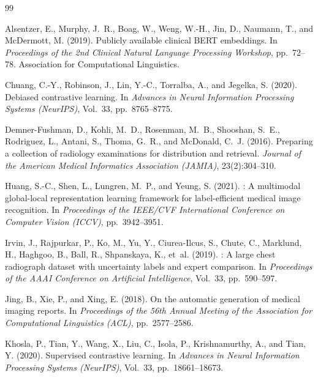 \documentclass[12pt, a4paper]{article}
\begin{document}
\begin{thebibliography}{99}

Alsentzer, E., Murphy, J.~R., Boag, W., Weng, W.-H., Jin, D., Naumann, T., and
  McDermott, M. (2019).
\newblock Publicly available clinical {BERT} embeddings.
\newblock In \textit{Proceedings of the 2nd Clinical Natural Language
  Processing Workshop}, pp.~72--78. Association for Computational Linguistics.

Chuang, C.-Y., Robinson, J., Lin, Y.-C., Torralba, A., and Jegelka, S. (2020).
\newblock Debiased contrastive learning.
\newblock In \textit{Advances in Neural Information Processing Systems
  (NeurIPS)}, Vol.~33, pp.~8765--8775.

Demner-Fushman, D., Kohli, M.~D., Rosenman, M.~B., Shooshan, S.~E., Rodriguez,
  L., Antani, S., Thoma, G.~R., and McDonald, C.~J. (2016).
\newblock Preparing a collection of radiology examinations for distribution and
  retrieval.
\newblock \textit{Journal of the American Medical Informatics Association
  (JAMIA)}, 23(2):304--310.

Huang, S.-C., Shen, L., Lungren, M.~P., and Yeung, S. (2021).
: A multimodal global-local representation learning framework
  for label-efficient medical image recognition.
\newblock In \textit{Proceedings of the IEEE/CVF International Conference on
  Computer Vision (ICCV)}, pp.~3942--3951.

Irvin, J., Rajpurkar, P., Ko, M., Yu, Y., Ciurea-Ilcus, S., Chute, C.,
  Marklund, H., Haghgoo, B., Ball, R., Shpanskaya, K., et~al. (2019).
: A large chest radiograph dataset with uncertainty labels
  and expert comparison.
\newblock In \textit{Proceedings of the AAAI Conference on Artificial
  Intelligence}, Vol.~33, pp.~590--597.

Jing, B., Xie, P., and Xing, E. (2018).
\newblock On the automatic generation of medical imaging reports.
\newblock In \textit{Proceedings of the 56th Annual Meeting of the Association
  for Computational Linguistics (ACL)}, pp.~2577--2586.

Khosla, P., Tian, Y., Wang, X., Liu, C., Isola, P., Krishnamurthy, A., and
  Tian, Y. (2020).
\newblock Supervised contrastive learning.
\newblock In \textit{Advances in Neural Information Processing Systems
  (NeurIPS)}, Vol.~33, pp.~18661--18673.


\end{thebibliography}
\end{document}
